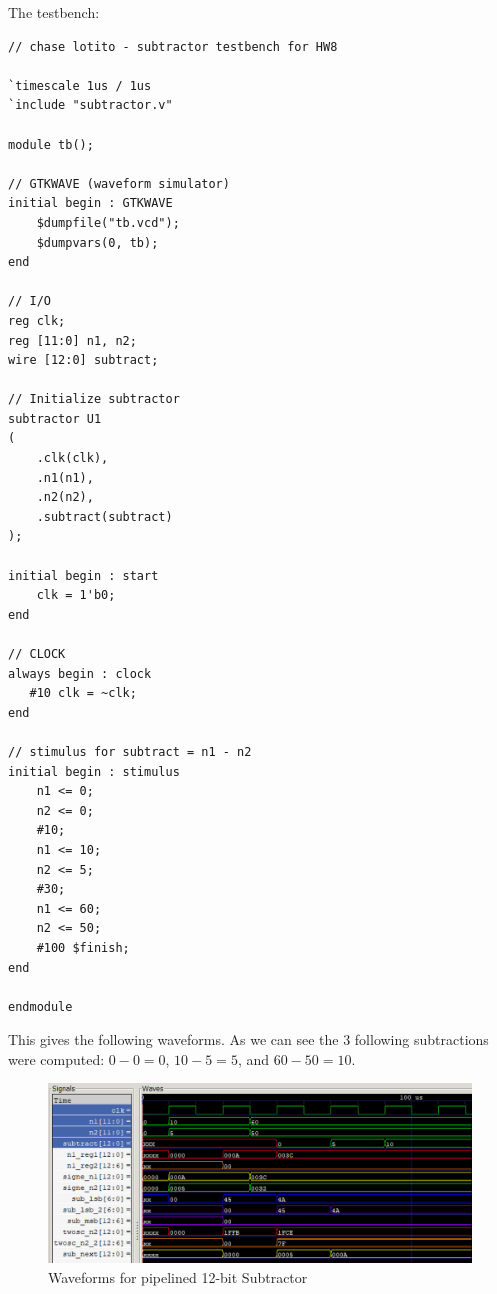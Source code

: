 \documentclass{article}
\begin{document}
The testbench:

\begin{lstlisting}
// chase lotito - subtractor testbench for HW8

`timescale 1us / 1us
`include "subtractor.v"

module tb();

// GTKWAVE (waveform simulator)
initial begin : GTKWAVE
    $dumpfile("tb.vcd");
    $dumpvars(0, tb);
end

// I/O
reg clk;
reg [11:0] n1, n2;
wire [12:0] subtract;

// Initialize subtractor
subtractor U1
(
    .clk(clk),
    .n1(n1),
    .n2(n2),
    .subtract(subtract)
);

initial begin : start
    clk = 1'b0;
end

// CLOCK
always begin : clock
   #10 clk = ~clk;
end

// stimulus for subtract = n1 - n2
initial begin : stimulus
    n1 <= 0;
    n2 <= 0;
    #10;
    n1 <= 10;
    n2 <= 5;
    #30;
    n1 <= 60;
    n2 <= 50;
    #100 $finish;
end

endmodule
\end{lstlisting}

This gives the following waveforms. As we can see the 3 following subtractions were computed: \(0-0=0\), \(10-5=5\), and \(60-50=10\).

\begin{figure}[!ht] 
    \centering
    \includegraphics[width = 15cm]{waves.png}
    \caption{Waveforms for pipelined 12-bit Subtractor}
    \label{fig:waves}
\end{figure}
\end{document}
